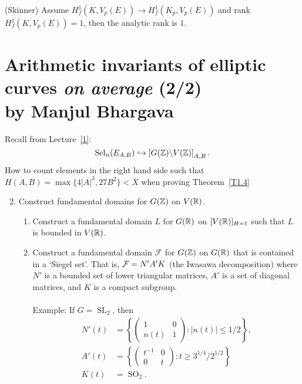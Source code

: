 \documentclass[12pt,amsfont]{amsart}
\begin{document}
\begin{thm} (Skinner) Assume $H_f^1(K, V_p(E)) \rightarrow H_f^1(K_p, V_p(E))$ and rank $H_f^1(K, V_p(E)) = 1$, then the analytic rank is $1$.
\end{thm}
\renewcommand{\thesubsection}{\arabic{section}.R}
\begingroup
\renewcommand{\addcontentsline}[3]{}%
\endgroup

\newpage
\renewcommand{\thesubsection}{\arabic{section}.\arabic{subsection}}

\section{Arithmetic invariants of elliptic curves \emph{on average} (2/2) \\
by Manjul Bhargava}\label{4}

Recall from Lecture~\ref{1}: 
\[
\operatorname{Sel}_n(E_{A,B}) \hookrightarrow \left[ G({\mathbb Z}) \backslash V({\mathbb Z})\right]_{A,B}.
\]
How to count elements in the right hand side such that $H(A,B) = \max\{4|A|^3, 27B^2\} < X$ when proving Theorem~\ref{T1.4}
\begin{enumerate}
\setcounter{enumi}{1}
\item
Construct fundamental domains for $G({\mathbb Z})$ on $V({\mathbb R})$.
\begin{enumerate}[\normalfont (i)]
\item
Construct a fundamental domain $L$ for $G({\mathbb R})$ on $[V({\mathbb R})]_{H=1}$ such that $L$ is bounded in $V({\mathbb R})$.  
\item
Construct a fundamental domain $\mathcal{F}$ for $G({\mathbb Z})$ on $G({\mathbb R})$ that is contained in a `Siegel set'. That is, $\mathcal{F} = N' A' K$ (the Iwasawa decomposition) where $N'$ is a bounded set of lower triangular matrices, $A'$ is a set of diagonal matrices, and $K$ is a compact subgroup. \\ \\
Example:
If $G = \operatorname{SL}_2$, then
\begin{align*}
 N'(t) &= \left \{ \begin{pmatrix} 1 & 0 \\ n(t) & 1 \end{pmatrix} : |n(t)| \leq 1/2 \right \},\\
A'(t) &= \left \{ \begin{pmatrix} t^{-1} & 0 \\ 0 & t \end{pmatrix} : t \geq 3^{1/4}/2^{1/2} \right\}\\
K(t)& = \operatorname{SO}_2.
\end{align*}
\end{enumerate}
\end{enumerate}
\end{document}
